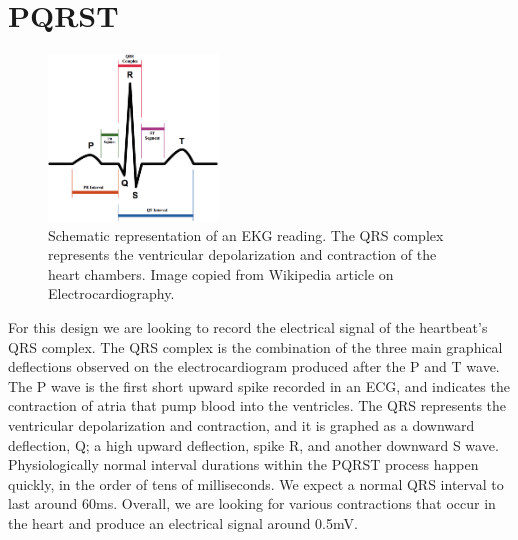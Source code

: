 \documentclass[11pt, oneside]{article}   	%
\begin{document}
\section{PQRST}

\begin{figure}
	\includegraphics[width=0.4\textwidth]{PQRST}
	\caption{Schematic representation of an EKG reading.  The QRS complex represents the ventricular depolarization and contraction of the heart chambers. \cite{wikiimage} Image copied from Wikipedia article on Electrocardiography.}
\end{figure}
	\onehalfspace

\par For this design we are looking to record the electrical signal of the heartbeat's QRS complex. The QRS complex is the combination of the three main graphical deflections observed on the electrocardiogram produced after the P and T wave. The P wave is the first short upward spike recorded in an ECG, and indicates the contraction of atria that pump blood into the ventricles. The QRS represents the ventricular depolarization and contraction, and it is graphed as a downward deflection, Q; a high upward deflection, spike R, and another downward S wave. Physiologically normal interval durations within the PQRST process happen quickly, in the order of tens of milliseconds. We expect a normal QRS interval to last around 60ms. Overall, we are looking for various contractions that occur in the heart and produce an electrical signal around 0.5mV. \cite{karptalk}
\end{document}
